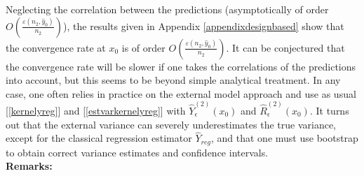 \documentclass[a4paper,12pt,leqno, titlepage]{article}
\begin{document}
Neglecting the correlation between the predictions (asymptotically of order $O(\frac{\varepsilon(n_2,\hat{y}_0)}{n_2})$), the results given in Appendix \ref{appendixdesignbased} show that the convergence rate at $x_0$ is of order $O(\frac{\varepsilon(n_2,\hat{y}_0)}{n_2})$. It can be conjectured that the convergence rate will be slower if one takes the correlations of the predictions into account, but this seems to be beyond simple analytical treatment. In any case, one often relies in practice on the external model approach and use as usual [\ref{kernelyreg}] and [\ref{estvarkernelyreg}] with
$\hat{Y}^{(2)}_{\epsilon}(x_0)$ and $\hat{R}^{(2)}_{\epsilon}(x_0)$. It turns out that the external variance can severely underestimates the true variance, except for the classical regression estimator $\hat{Y}_{reg}$, and that one must use bootstrap to obtain correct variance estimates and confidence intervals. \\[0.5cm]
\noindent
 \textbf{Remarks:}\\
\end{document}
